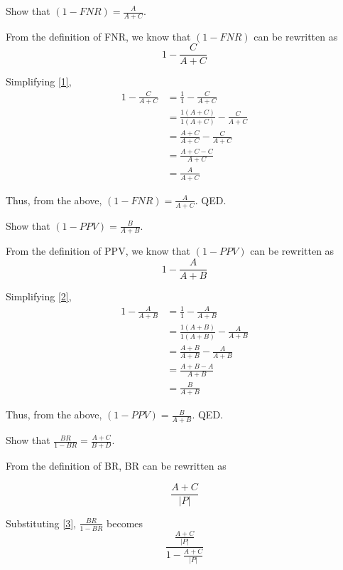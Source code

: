 \documentclass{cisXXX} %
\begin{document}
\maketitle
\HWproblem
Show that $(1-FNR) = \frac{A}{A+C}$.

From the definition of FNR, we know that $(1-FNR)$ can be rewritten as 
\begin{equation}
\label{1} 1-\frac{C}{A+C}
\end{equation}

Simplifying \eqref{1},
\begin{align*}
1-\frac{C}{A+C} &= \frac{1}{1} - \frac{C}{A+C}\\
&=\frac{1(A+C)}{1(A+C)} - \frac{C}{A+C}\\
&=\frac{A+C}{A+C} - \frac{C}{A+C}\\
&=\frac{A+C-C}{A+C}\\
&=\frac{A}{A+C}
\end{align*}

Thus, from the above, $(1-FNR) = \frac{A}{A+C}$. QED.

\HWproblem
Show that $(1-PPV) = \frac{B}{A+B}$.

From the definition of PPV, we know that $(1-PPV)$ can be rewritten as
\begin{equation}
\label{2} 1-\frac{A}{A+B}
\end{equation}

Simplifying \eqref{2},
\begin{align*}
1-\frac{A}{A+B} &= \frac{1}{1} - \frac{A}{A+B}\\
&= \frac{1(A+B)}{1(A+B)} - \frac{A}{A+B}\\
&= \frac{A+B}{A+B} - \frac{A}{A+B}\\
&= \frac{A+B - A}{A+B}\\
&= \frac{B}{A+B}
\end{align*}

Thus, from the above, $(1-PPV) = \frac{B}{A+B}$. QED.

\HWproblem
Show that $\frac{BR}{1-BR} = \frac{A+C}{B+D}$.

From the definition of BR, BR can be rewritten as

\begin{equation}
\label{3} \frac{A+C}{|P|}
\end{equation}

Substituting \eqref{3}, $\frac{BR}{1-BR}$ becomes
\begin{equation}
\label{4} \frac{\frac{A+C}{|P|}}{1-\frac{A+C}{|P|}}
\end{equation}
\end{document}
